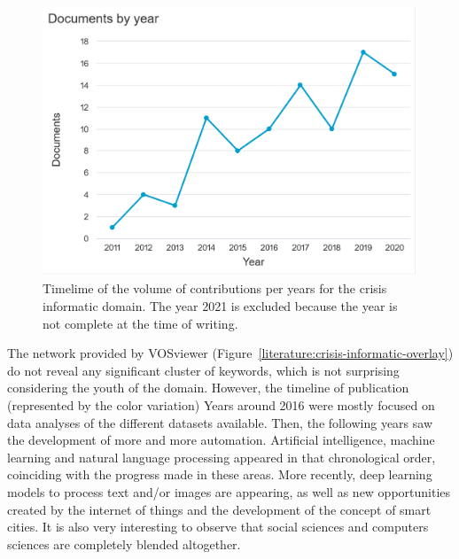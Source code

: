 \begin{figure}[bp]
    \centering
    \includegraphics[width=\textwidth]{figures/chap-2/crisis-informatic-hist.pdf}
    \caption{Timelime of the volume of contributions per years for the crisis informatic domain. The year 2021 is excluded because the year is not complete at the time of writing.}
    \label{literature:crisis-informatic-hist}
\end{figure}

The network provided by VOSviewer (Figure~\ref{literature:crisis-informatic-overlay}) do not reveal any significant cluster of keywords, which is not surprising considering the youth of the domain.
However, the timeline of publication (represented by the color variation)
Years around 2016 were mostly focused on data analyses of the different datasets available.
Then, the following years saw the development of more and more automation.
Artificial intelligence, machine learning and natural language processing appeared in that chronological order, coinciding with the progress made in these areas.
More recently, deep learning models to process text and/or images are appearing, as well as new opportunities created by the internet of things and the development of the concept of smart cities.
It is also very interesting to observe that social sciences and computers sciences are completely blended altogether.

